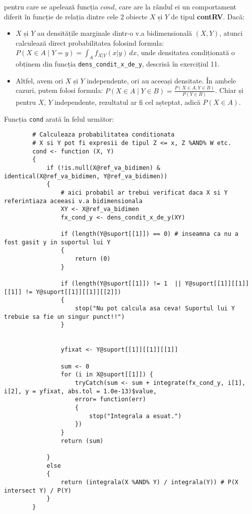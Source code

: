 \documentclass[12pt]{article}
\begin{document}
	pentru care se apelează funcția $cond$, care are la rândul ei un comportament diferit în funcție de relația dintre cele 2 obiecte $X$ și $Y$ de tipul \textbf{contRV}. Dacă:
	\begin{itemize}
		\item $X$ și $Y$ au densitățile marginale dintr-o v.a bidimensională $(X, Y)$, atunci calculează direct probabilitatea folosind formula: $P(X \in A \mid Y = y) = \int_{A} f_{X|Y}(x|y) \,dx$, unde densitatea condiționată o obținem din funcția \texttt{dens\_condit\_x\_de\_y}, descrisă în exercițiul 11.
		\item Altfel, avem ori $X$ și $Y$ independente, ori au aceeași densitate. În ambele cazuri, putem folosi formula: $P(X \in A \mid Y \in B) = \frac{P(X \in A, Y \in B)}{P(Y \in B)}$. Chiar și pentru $X$, $Y$ independente, rezultatul ar fi cel așteptat, adică $P(X \in A)$.
	\end{itemize}\pagebreak

	Funcția \texttt{cond} arată în felul următor:
	\begin{lstlisting}
		# Calculeaza probabilitatea conditionata
		# X si Y pot fi expresii de tipul Z <= x, Z %AND% W etc.
		cond <- function (X, Y)
		{
			if (!is.null(X@ref_va_bidimen) & identical(X@ref_va_bidimen, Y@ref_va_bidimen))
			{
				# aici probabil ar trebui verificat daca X si Y referintiaza aceeasi v.a bidimensionala
				XY <- X@ref_va_bidimen
				fx_cond_y <- dens_condit_x_de_y(XY)
				
				if (length(Y@suport[[1]]) == 0) # inseamna ca nu a fost gasit y in suportul lui Y
				{
					return (0)
				}
				
				if (length(Y@suport[[1]]) != 1  || Y@suport[[1]][[1]][[1]] != Y@suport[[1]][[1]][[2]])
				{
					stop("Nu pot calcula asa ceva! Suportul lui Y trebuie sa fie un singur punct!!")
				}
				
				
				yfixat <- Y@suport[[1]][[1]][[1]]
				
				sum <- 0
				for (i in X@suport[[1]]) {
					tryCatch(sum <- sum + integrate(fx_cond_y, i[1], i[2], y = yfixat, abs.tol = 1.0e-13)$value,
					error= function(err)
					{
						stop("Integrala a esuat.")
					})
				}
				return (sum)
				
			}
			else
			{
				return (integrala(X %AND% Y) / integrala(Y)) # P(X intersect Y) / P(Y)
			}
		}
	\end{lstlisting}\pagebreak
\end{document}
